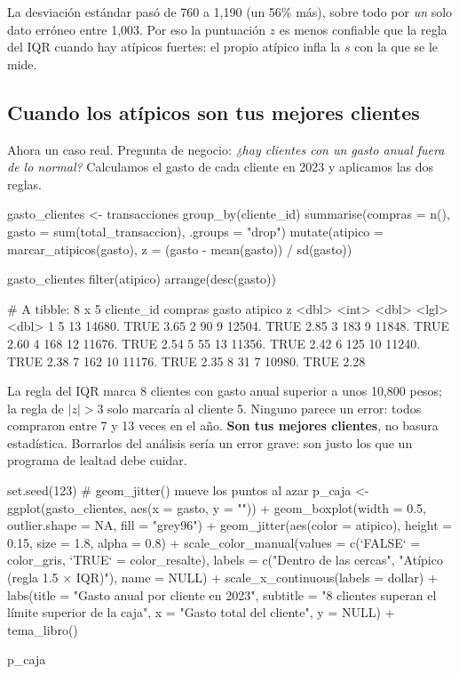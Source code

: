 La desviación estándar pasó de 760 a 1,190 (un 56\% más), sobre todo por
\emph{un} solo dato erróneo entre 1,003. Por eso la puntuación $z$ es menos confiable que la regla del
IQR cuando hay atípicos fuertes: el propio atípico infla la $s$ con la que se
le mide.

\subsection{Cuando los atípicos son tus mejores clientes}

Ahora un caso real. Pregunta de negocio: \emph{¿hay clientes con un gasto
anual fuera de lo normal?} Calculamos el gasto de cada cliente en 2023 y
aplicamos las dos reglas.

\begin{rcode}
gasto_clientes <- transacciones %
  group_by(cliente_id) %
  summarise(compras = n(),
            gasto   = sum(total_transaccion),
            .groups = "drop") %
  mutate(atipico = marcar_atipicos(gasto),
         z       = (gasto - mean(gasto)) / sd(gasto))

gasto_clientes %
  filter(atipico) %
  arrange(desc(gasto))
\end{rcode}
\begin{rsalida}
# A tibble: 8 x 5
  cliente_id compras  gasto atipico     z
       <dbl>   <int>  <dbl> <lgl>   <dbl>
1          5      13 14680. TRUE     3.65
2         90       9 12504. TRUE     2.85
3        183       9 11848. TRUE     2.60
4        168      12 11676. TRUE     2.54
5         55      13 11356. TRUE     2.42
6        125      10 11240. TRUE     2.38
7        162      10 11176. TRUE     2.35
8         31       7 10980. TRUE     2.28
\end{rsalida}

La regla del IQR marca 8 clientes con gasto anual superior a unos 10,800
pesos; la regla de $|z| > 3$ solo marcaría al cliente 5. Ninguno parece un
error: todos compraron entre 7 y 13 veces en el año. \textbf{Son tus mejores
clientes}, no basura estadística. Borrarlos del análisis sería un error grave:
son justo los que un programa de lealtad debe cuidar.

\begin{rcode}
set.seed(123)   # geom_jitter() mueve los puntos al azar
p_caja <- ggplot(gasto_clientes, aes(x = gasto, y = "")) +
  geom_boxplot(width = 0.5, outlier.shape = NA, fill = "grey96") +
  geom_jitter(aes(color = atipico), height = 0.15,
              size = 1.8, alpha = 0.8) +
  scale_color_manual(values = c(`FALSE` = color_gris,
                                `TRUE` = color_resalte),
                     labels = c("Dentro de las cercas",
                                "Atípico (regla 1.5 × IQR)"),
                     name = NULL) +
  scale_x_continuous(labels = dollar) +
  labs(title = "Gasto anual por cliente en 2023",
       subtitle = "8 clientes superan el límite superior de la caja",
       x = "Gasto total del cliente", y = NULL) +
  tema_libro()

p_caja
\end{rcode}

